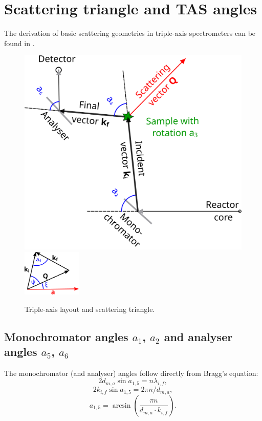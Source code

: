 \section{Scattering triangle and TAS angles}

The derivation of basic scattering geometries in triple-axis spectrometers can be found in \cite[Ch. 1.3]{Shirane2002}.

\begin{figure}
\begin{center}
	\includegraphics[width = 0.5 \textwidth]{figures/tas}
	\hspace{1.5cm}
	\includegraphics[trim=0 -2cm 0 0, width=0.25\textwidth]{figures/triangle}
\end{center}
\caption{Triple-axis layout and scattering triangle.}
\end{figure}


\subsection*{Monochromator angles $a_1$, $a_2$ and analyser angles $a_5$, $a_6$}

The monochromator (and analyser) angles follow directly from Bragg's equation:
\begin{equation} 2 d_{m,a}\sin a_{1,5} = n \lambda_{i,f}, \end{equation}
\begin{equation} 2 k_{i,f} \sin a_{1,5} = 2 \pi n / d_{m,a}, \end{equation}
\begin{equation} \boxed{ a_{1,5} = \arcsin \left( \frac{\pi n}{d_{m,a} \cdot k_{i,f}} \right). } \end{equation}

